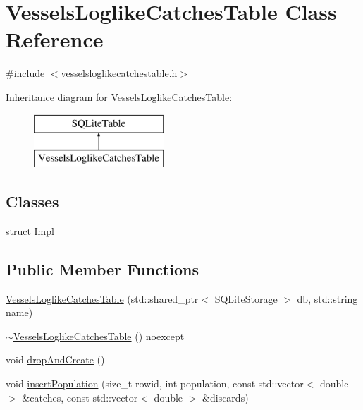 \hypertarget{class_vessels_loglike_catches_table}{}\section{Vessels\+Loglike\+Catches\+Table Class Reference}
\label{class_vessels_loglike_catches_table}


{\ttfamily \#include $<$vesselsloglikecatchestable.\+h$>$}

Inheritance diagram for Vessels\+Loglike\+Catches\+Table\+:\begin{figure}[H]
\begin{center}
\leavevmode
\includegraphics[height=2.000000cm]{d6/d9c/class_vessels_loglike_catches_table}
\end{center}
\end{figure}
\subsection*{Classes}
\begin{DoxyCompactItemize}
\item 
struct \mbox{\hyperlink{struct_vessels_loglike_catches_table_1_1_impl}{Impl}}
\end{DoxyCompactItemize}
\subsection*{Public Member Functions}
\begin{DoxyCompactItemize}
\item 
\mbox{\hyperlink{class_vessels_loglike_catches_table_acb4132f8dd1c99224bd44b20cfc02952}{Vessels\+Loglike\+Catches\+Table}} (std\+::shared\+\_\+ptr$<$ S\+Q\+Lite\+Storage $>$ db, std\+::string name)
\item 
\mbox{\hyperlink{class_vessels_loglike_catches_table_ae7efc80500d4cc5a973c8c8c63b01296}{$\sim$\+Vessels\+Loglike\+Catches\+Table}} () noexcept
\item 
void \mbox{\hyperlink{class_vessels_loglike_catches_table_a7e0f6747d1c22074f01ab9ff4ad4e06a}{drop\+And\+Create}} ()
\item 
void \mbox{\hyperlink{class_vessels_loglike_catches_table_abd231d4fd46d476b18646419e7a59164}{insert\+Population}} (size\+\_\+t rowid, int population, const std\+::vector$<$ double $>$ \&catches, const std\+::vector$<$ double $>$ \&discards)
\end{DoxyCompactItemize}
